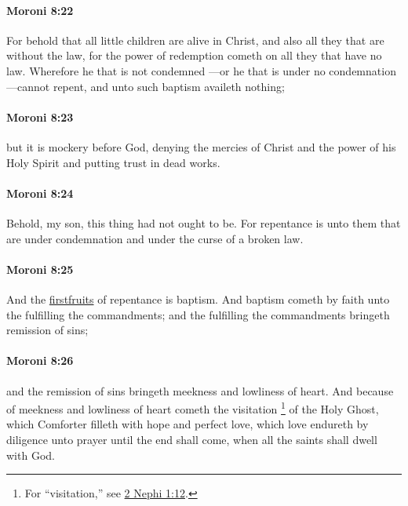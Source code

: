		\paragraph{Moroni 8:22} %
			\label{MORONI-8-22}

			For behold that all little children are alive in Christ,
			and also all they that are without the law,
			for the power of redemption cometh on all they that have no law.
			Wherefore he that is not condemned
			---or he that is under no condemnation---cannot repent,
			and unto such baptism availeth nothing;

		\paragraph{Moroni 8:23} %
			\label{MORONI-8-23}

			but it is mockery before God,
			denying the mercies of Christ and the power of his Holy Spirit
			and putting trust in dead works.

		\paragraph{Moroni 8:24} %
			\label{MORONI-8-24}

			Behold, my son, this thing had not ought to be.
			For repentance is unto them that are under condemnation
			and under the curse of a broken law.

		\paragraph{Moroni 8:25} %
			\label{MORONI-8-25}
			
			And the \hyperref[FIRSTFRUITS]{firstfruits} of repentance is baptism.
			And baptism cometh by faith unto the fulfilling the commandments;
			and the fulfilling the commandments bringeth remission of sins;
			
		\paragraph{Moroni 8:26} %
			\label{MORONI-8-26}
			
			and the remission of sins bringeth meekness and lowliness of heart.
			And because of meekness and lowliness of heart
			cometh the visitation%
			\footnote{%
				For ``visitation,'' see \hyperref[2NEPHI-1-12]{2 Nephi 1:12}.
				} 
			of the Holy Ghost,
			which Comforter filleth with hope and perfect love,
			which love endureth by diligence unto prayer
			until the end shall come,
			when all the saints shall dwell with God.


